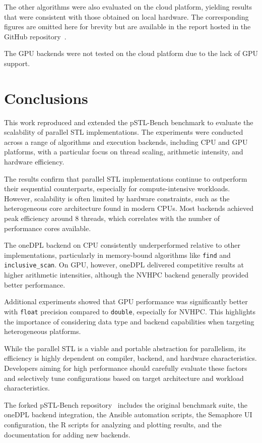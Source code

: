 \documentclass[sigconf]{acmart}
\begin{document}
The other algorithms were also evaluated on the cloud platform, yielding
results that were consistent with those obtained on local hardware. The
corresponding figures are omitted here for brevity but are available in the
report hosted in the GitHub repository~\cite{pSTL-Bench-report:github}.

The GPU backends were not tested on the cloud platform due to the lack of GPU
support.

\section{Conclusions}

This work reproduced and extended the pSTL-Bench benchmark to evaluate the
scalability of parallel STL implementations. The experiments were conducted
across a range of algorithms and execution backends, including CPU and GPU
platforms, with a particular focus on thread scaling, arithmetic intensity, and
hardware efficiency.

The results confirm that parallel STL implementations continue to outperform
their sequential counterparts, especially for compute-intensive workloads.
However, scalability is often limited by hardware constraints, such as the
heterogeneous core architecture found in modern CPUs. Most backends achieved
peak efficiency around 8 threads, which correlates with the number of
performance cores available.

The oneDPL backend on CPU consistently underperformed relative to other
implementations, particularly in memory-bound algorithms like \texttt{find} and
\texttt{inclusive\_scan}. On GPU, however, oneDPL delivered competitive results
at higher arithmetic intensities, although the NVHPC backend generally provided
better performance.

Additional experiments showed that GPU performance was significantly better
with \texttt{float} precision compared to \texttt{double}, especially for
NVHPC. This highlights the importance of considering data type and backend
capabilities when targeting heterogeneous platforms.

While the parallel STL is a viable and portable abstraction for parallelism,
its efficiency is highly dependent on compiler, backend, and hardware
characteristics. Developers aiming for high performance should carefully
evaluate these factors and selectively tune configurations based on target
architecture and workload characteristics.

The forked pSTL-Bench repository~\cite{pSTL-Bench_fork:github} includes the
original benchmark suite, the oneDPL backend integration, the Ansible
automation scripts, the Semaphore UI configuration, the R scripts for analyzing
and plotting results, and the documentation for adding new backends.
\end{document}

